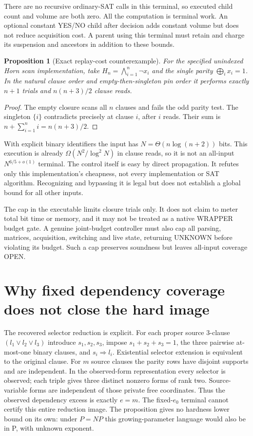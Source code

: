 \documentclass[11pt]{article}
\newtheorem{proposition}[theorem]{Proposition}
\begin{document}
There are no recursive ordinary-SAT calls in this terminal, so executed
child count and volume are both zero. All the computation is terminal work.
An optional constant YES/NO child after decision adds constant volume but
does not reduce acquisition cost. A parent using this terminal must retain
and charge its suspension and ancestors in addition to these bounds.

\begin{proposition}[Exact replay-cost counterexample]
For the specified unindexed Horn scan implementation, take
$H_n=\bigwedge_{i=1}^n\neg x_i$ and the single parity
$\bigoplus_i x_i=1$. In the natural clause order and empty-then-singleton
pin order it performs exactly $n+1$ trials and $n(n+3)/2$ clause reads.
\end{proposition}
\begin{proof}
The empty closure scans all $n$ clauses and fails the odd parity test.
The singleton $\{i\}$ contradicts precisely at clause $i$, after $i$ reads.
Their sum is $n+\sum_{i=1}^n i=n(n+3)/2$.
\end{proof}
With explicit binary identifiers the input has $N=\Theta(n\log(n+2))$
bits. This execution is already $\Omega(N^2/\log^2N)$ in clause reads,
so it is not an all-input $N^{6/5+o(1)}$ terminal. The control itself is
easy by direct propagation. It refutes only this implementation's cheapness,
not every implementation or SAT algorithm. Recognizing and bypassing it is
legal but does not establish a global bound for all other inputs.

The cap in the executable limits closure trials only. It does not claim
to meter total bit time or memory, and it may not be treated as a native
WRAPPER budget gate. A genuine joint-budget controller must also cap all
parsing, matrices, acquisition, switching and live state, returning UNKNOWN
before violating its budget. Such a cap preserves soundness but leaves
all-input coverage OPEN.

\section{Why fixed dependency coverage does not close the hard image}
The recovered selector reduction is explicit. For each proper source
3-clause $(l_1\vee l_2\vee l_3)$ introduce $s_1,s_2,s_3$, impose
$s_1+s_2+s_3=1$, the three pairwise at-most-one binary clauses, and
$s_i\Rightarrow l_i$. Existential selector extension is equivalent to the
original clause. For $m$ source clauses the parity rows have disjoint
supports and are independent. In the observed-form representation every
selector is observed; each triple gives three distinct nonzero forms of
rank two. Source-variable forms are independent of those private free
coordinates. Thus the observed dependency excess is exactly $e=m$.
The fixed-$e_0$ terminal cannot certify this entire reduction image.
The proposition gives no hardness lower bound on its own: under $P=NP$
this growing-parameter language would also be in P, with unknown exponent.
\end{document}
